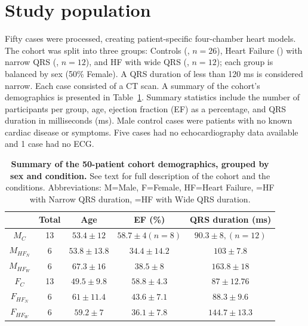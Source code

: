 \section{Study population}
Fifty cases were processed, creating patient-specific four-chamber heart models. 
The cohort was split into three groups: Controls (\Ctl, $n=26$), Heart Failure (\HF) with narrow QRS (\HFN, $n=12$), 
and HF with wide QRS (\HFW, $n=12$); each group is balanced by sex (50\% Female).
A QRS duration of less than 120 ms is considered narrow.
Each case consisted of a CT scan.
A summary of the cohort's demographics is presented in Table~\ref{tab:materials-demographics}. 
Summary statistics include the number of participants per group, age, 
ejection fraction (EF) as a percentage, and QRS duration in milliseconds (ms). 
Male control cases were patients with no known cardiac disease or symptoms. 
Five cases had no echocardiography data available and 1 case had no ECG.

\begin{table}[hbpt]
    \centering
    \caption{
        \textbf{Summary of the 50-patient cohort demographics, grouped by sex and condition. }
        See text for full description of the cohort and the conditions.
        Abbreviations: M=Male, F=Female, HF=Heart Failure, \HFN=HF with Narrow QRS duration, 
        \HFW=HF with Wide QRS duration.
    }
    \vspace{1em} 
    \begin{tabular}{c|cccc}
                   & Total  & Age            &  EF (\%)        & QRS duration (ms)\\
        \hline
        \hline 
        $M_C$      & 13 & $53.4\pm 12$   &  $58.7\pm 4 (n=8)$ & $90.3\pm 8, (n=12)$\\
        $M_{HF_N}$ &  6 & $53.8\pm 13.8$ & $34.4\pm 14.2$ & $103\pm 7.8$     \\
        $M_{HF_W}$ &  6 & $67.3\pm 16 $  & $38.5\pm 8$    & $163.8\pm 18 $   \\
        \hline 
        $F_C$      & 13 & $49.5\pm 9.8$  & $58.8\pm 4.3$  & $87\pm 1 2.76 $  \\
        $F_{HF_N}$ &  6 & $61\pm 11.4$   & $43.6\pm 7.1$  & $88.3\pm 9.6 $   \\
        $F_{HF_W}$ &  6 & $59.2\pm 7 $   & $36.1\pm7.8$   & $144.7\pm 13.3 $ \\
        \hline 
    \end{tabular}
    \label{tab:materials-demographics}
\end{table}
